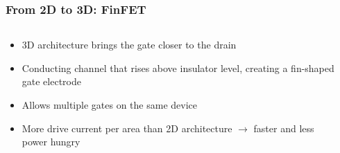 \documentclass{beamer}
\begin{document}
\begin{frame}\frametitle{From 2D to 3D: FinFET} 
\begin{columns}
\begin{column}{5.8cm}
\begin{itemize}
\item<1-> 3D architecture brings the gate closer to the drain

\item<2-> Conducting channel that rises above insulator level, creating a fin-shaped gate electrode

\item<3-> Allows multiple gates on the same device

\item<4-> More drive current per area than 2D architecture \newline $\rightarrow$ faster and less power hungry

\end{itemize}
\end{column}
\begin{column}{6cm}
\begin{center}
\begin{overprint}



\end{overprint}
\end{center}
\end{column}
\end{columns}
\end{frame}
\end{document}
